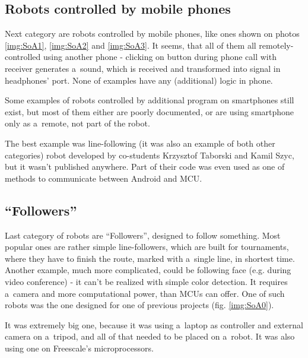 \subsection{Robots controlled by mobile phones}
Next category are robots controlled by mobile phones, like ones shown on photos
\ref{img:SoA1}, \ref{img:SoA2} and \ref{img:SoA3}.
It seems, that all of them all remotely-controlled using another phone -
clicking on button during phone call with receiver generates a~sound, which is received and transformed into
signal in headphones' port.
None of examples have any (additional) logic in phone. 

Some examples of robots controlled by additional program on smartphones
still exist, but most of them either are poorly documented, or are using
smartphone only as a~remote, not part of the robot. 

The best example was line-following (it was also an example of both other
categories) robot developed by co-students Krzysztof Taborski and Kamil Szyc,
but it wasn't published anywhere.
Part of their code was even used as one of methods to communicate between
Android and MCU.


\clearpage

\subsection{``Followers''}
Last category of robots are ``Followers'', designed to follow something.
Most popular ones are rather simple line-followers, which are built for
tournaments, where they have to finish the route, marked with a~single line, in
shortest time.
Another example, much more complicated, could be following face (e.g. during
video conference) - it can't be realized with simple color detection. 
It requires a~camera and more computational power, than MCUs can offer.
One of such robots was the one designed for one of previous projects (fig.
\ref{img:SoA0}). 

It was extremely big one, because it was using a~laptop as controller
and external camera on a~tripod, and all of that needed to be placed on a~robot.
It was also using one on Freescale's microprocessors.

